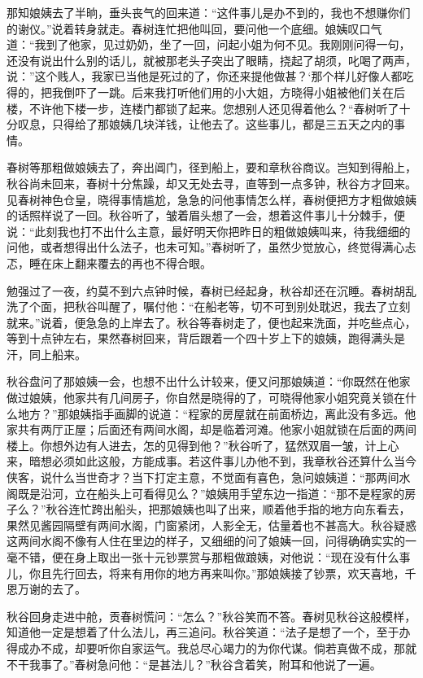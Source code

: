 \documentclass[12pt,UTF8]{ctexbook}
\begin{document}
{{{那知娘姨去了半晌，垂头丧气的回来道：“这件事儿是办不到的，我也不想赚你们的谢仪。”说着转身就走。春树连忙把他叫回，要问他一个底细。娘姨叹口气道：“我到了他家，见过奶奶，坐了一回，问起小姐为何不见。我刚刚问得一句，还没有说出什么别的话儿，就被那老头子突出了眼睛，挠起了胡须，叱喝了两声，说：”这个贱人，我家已当他是死过的了，你还来提他做甚？‘那个样儿好像人都吃得的，把我倒吓了一跳。后来我打听他们用的小大姐，方晓得小姐被他们关在后楼，不许他下楼一步，连楼门都锁了起来。您想别人还见得着他么？“春树听了十分叹息，只得给了那娘姨几块洋钱，让他去了。这些事儿，都是三五天之内的事情。

春树等那粗做娘姨去了，奔出阊门，径到船上，要和章秋谷商议。岂知到得船上，秋谷尚未回来，春树十分焦躁，却又无处去寻，直等到一点多钟，秋谷方才回来。见春树神色仓皇，晓得事情尴尬，急急的问他事情怎么样，春树便把方才粗做娘姨的话照样说了一回。秋谷听了，皱着眉头想了一会，想着这件事儿十分棘手，便说：“此刻我也打不出什么主意，最好明天你把昨日的粗做娘姨叫来，待我细细的问他，或者想得出什么法子，也未可知。”春树听了，虽然少觉放心，终觉得满心忐忑，睡在床上翻来覆去的再也不得合眼。

勉强过了一夜，约莫不到六点钟时候，春树已经起身，秋谷却还在沉睡。春树胡乱洗了个面，把秋谷叫醒了，嘱付他：“在船老等，切不可到别处耽迟，我去了立刻就来。”说着，便急急的上岸去了。秋谷等春树走了，便也起来洗面，并吃些点心，等到十点钟左右，果然春树回来，背后跟着一个四十岁上下的娘姨，跑得满头是汗，同上船来。

秋谷盘问了那娘姨一会，也想不出什么计较来，便又问那娘姨道：“你既然在他家做过娘姨，他家共有几间房子，你自然是晓得的了，可晓得他家小姐究竟关锁在什么地方？”那娘姨指手画脚的说道：“程家的房屋就在前面桥边，离此没有多远。他家共有两厅正屋；后面还有两间水阁，却是临着河滩。他家小姐就锁在后面的两间楼上。你想外边有人进去，怎的见得到他？”秋谷听了，猛然双眉一皱，计上心来，暗想必须如此这般，方能成事。若这件事儿办他不到，我章秋谷还算什么当今侠客，说什么当世奇才？当下打定主意，不觉面有喜色，急问娘姨道：“那两间水阁既是沿河，立在船头上可看得见么？”娘姨用手望东边一指道：“那不是程家的房子么？”秋谷连忙跨出船头，把那娘姨也叫了出来，顺着他手指的地方向东看去，果然见酱园隔壁有两间水阁，门窗紧闭，人影全无，估量着也不甚高大。秋谷疑惑这两间水阁不像有人住在里边的样子，又细细的问了娘姨一回，问得确确实实的一毫不错，便在身上取出一张十元钞票赏与那粗做踉姨，对他说：“现在没有什么事儿，你且先行回去，将来有用你的地方再来叫你。”那娘姨接了钞票，欢天喜地，千恩万谢的去了。

秋谷回身走进中舱，贡春树慌问：“怎么？”秋谷笑而不答。春树见秋谷这般模样，知道他一定是想着了什么法儿，再三追问。秋谷笑道：“法子是想了一个，至于办得成办不成，却要听你自家运气。我总尽心竭力的为你代谋。倘若真做不成，那就不干我事了。”春树急问他：“是甚法儿？”秋谷含着笑，附耳和他说了一遍。

}}}
\end{document}
